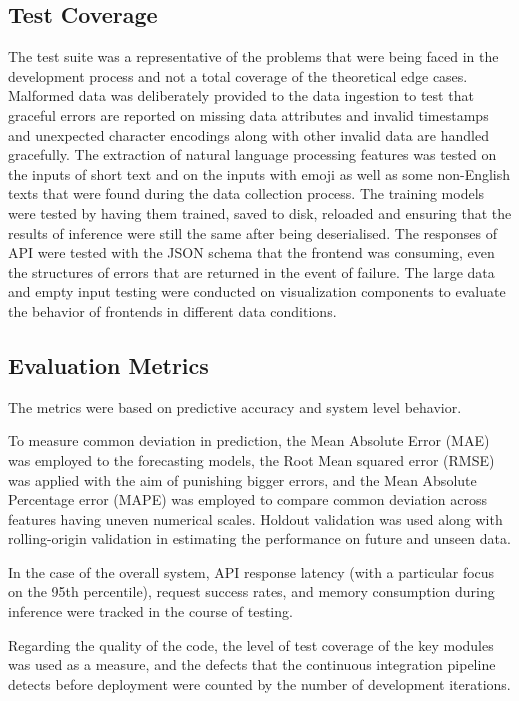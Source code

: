 \subsection{Test Coverage}
The test suite was a representative of the problems that were being faced in the development process and not a total coverage of the theoretical edge cases. Malformed data was deliberately provided to the data ingestion to test that graceful errors are reported on missing data attributes and invalid timestamps and unexpected character encodings along with other invalid data are handled gracefully. The extraction of natural language processing features was tested on the inputs of short text and on the inputs with emoji as well as some non-English texts that were found during the data collection process. The training models were tested by having them trained, saved to disk, reloaded and ensuring that the results of inference were still the same after being deserialised. The responses of API were tested with the JSON schema that the frontend was consuming, even the structures of errors that are returned in the event of failure. The large data and empty input testing were conducted on visualization components to evaluate the behavior of frontends in different data conditions.

\subsection{Evaluation Metrics}
The metrics were based on predictive accuracy and system level behavior.

To measure common deviation in prediction, the Mean Absolute Error (MAE) was employed to the forecasting models, the Root Mean squared error (RMSE) was applied with the aim of punishing bigger errors, and the Mean Absolute Percentage error (MAPE) was employed to compare common deviation across features having uneven numerical scales. Holdout validation was used along with rolling-origin validation in estimating the performance on future and unseen data.

In the case of the overall system, API response latency (with a particular focus on the 95th percentile), request success rates, and memory consumption during inference were tracked in the course of testing.

Regarding the quality of the code, the level of test coverage of the key modules was used as a measure, and the defects that the continuous integration pipeline detects before deployment were counted by the number of development iterations.

